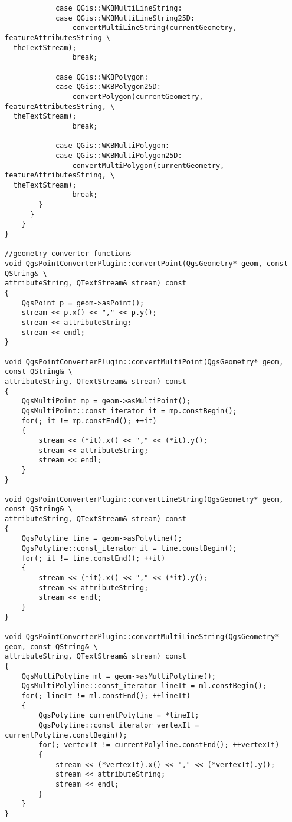\begin{verbatim}
            case QGis::WKBMultiLineString:
            case QGis::WKBMultiLineString25D:
                convertMultiLineString(currentGeometry, featureAttributesString \
  theTextStream);
                break;

            case QGis::WKBPolygon:
            case QGis::WKBPolygon25D:
                convertPolygon(currentGeometry, featureAttributesString, \
  theTextStream);
                break;

            case QGis::WKBMultiPolygon:
            case QGis::WKBMultiPolygon25D:
                convertMultiPolygon(currentGeometry, featureAttributesString, \
  theTextStream);
                break;
        }
      }
    }
}

//geometry converter functions
void QgsPointConverterPlugin::convertPoint(QgsGeometry* geom, const QString& \
attributeString, QTextStream& stream) const
{
    QgsPoint p = geom->asPoint();
    stream << p.x() << "," << p.y();
    stream << attributeString;
    stream << endl;
}

void QgsPointConverterPlugin::convertMultiPoint(QgsGeometry* geom, const QString& \
attributeString, QTextStream& stream) const
{
    QgsMultiPoint mp = geom->asMultiPoint();
    QgsMultiPoint::const_iterator it = mp.constBegin();
    for(; it != mp.constEnd(); ++it)
    {
        stream << (*it).x() << "," << (*it).y();
        stream << attributeString;
        stream << endl;
    }
}

void QgsPointConverterPlugin::convertLineString(QgsGeometry* geom, const QString& \
attributeString, QTextStream& stream) const
{
    QgsPolyline line = geom->asPolyline();
    QgsPolyline::const_iterator it = line.constBegin();
    for(; it != line.constEnd(); ++it)
    {
        stream << (*it).x() << "," << (*it).y();
        stream << attributeString;
        stream << endl;
    }
}

void QgsPointConverterPlugin::convertMultiLineString(QgsGeometry* geom, const QString& \
attributeString, QTextStream& stream) const
{
    QgsMultiPolyline ml = geom->asMultiPolyline();
    QgsMultiPolyline::const_iterator lineIt = ml.constBegin();
    for(; lineIt != ml.constEnd(); ++lineIt)
    {
        QgsPolyline currentPolyline = *lineIt;
        QgsPolyline::const_iterator vertexIt = currentPolyline.constBegin();
        for(; vertexIt != currentPolyline.constEnd(); ++vertexIt)
        {
            stream << (*vertexIt).x() << "," << (*vertexIt).y();
            stream << attributeString;
            stream << endl;
        }
    }
}


\end{verbatim}
